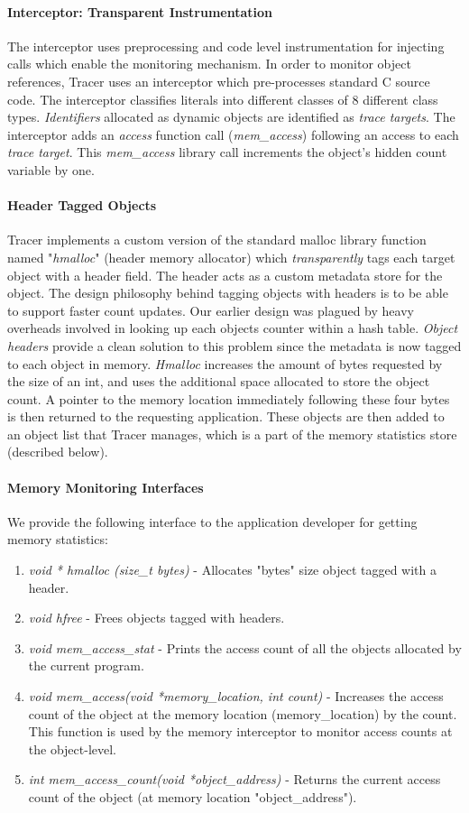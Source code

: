 \paragraph{Interceptor: Transparent Instrumentation}
The interceptor uses preprocessing and code level instrumentation for injecting calls which enable the monitoring mechanism. In order to monitor object references, Tracer uses an interceptor which pre-processes standard C source code. The interceptor classifies literals into different classes of 8 different class types. {\emph{Identifiers}} allocated as dynamic objects are identified as {\emph{trace targets}}. The interceptor adds an {\emph{access}} function call ({\emph{mem\_access}}) following an access to each {\emph{trace target}}. This {\emph{mem\_access}} library call increments the object's hidden count variable by one. 
\paragraph{Header Tagged Objects}
Tracer implements a custom version of the standard malloc library function named "{\emph{hmalloc}}" (header memory allocator) which {\emph{transparently}} tags each target object with a header field. The header acts as a custom metadata store for the object. The design philosophy behind tagging objects with headers is to be able to support faster count updates. Our earlier design was plagued by heavy overheads involved in looking up each objects counter within a hash table. {\emph{Object headers}} provide a clean solution to this problem since the metadata is now tagged to each object in memory. {\emph{Hmalloc}} increases the amount of bytes requested by the size of an int, and uses the additional space allocated to store the object count. A pointer to the memory location immediately following these four bytes is then returned to the requesting application. These objects are then added to an object list that Tracer manages, which is a part of the memory statistics store (described below).
\paragraph{Memory Monitoring Interfaces}
We provide the following interface to the application developer for getting memory statistics:
\begin{enumerate}
\item {\emph{void * hmalloc (size\_t bytes)}} - Allocates "bytes" size object tagged with a header.
\item {\emph{void hfree}} - Frees objects tagged with headers.
\item {\emph{void mem\_access\_stat}} - Prints the access count of all the objects allocated by the current program.
\item{\emph{void mem\_access(void *memory\_location, int count)}} - Increases the access count of the object at the memory location (memory\_location) by the count. This function is used by the memory interceptor to monitor access counts at the object-level.
\item {\emph{int mem\_access\_count(void *object\_address)}} - Returns the current access count of the object (at memory location "object\_address").
\end{enumerate}

